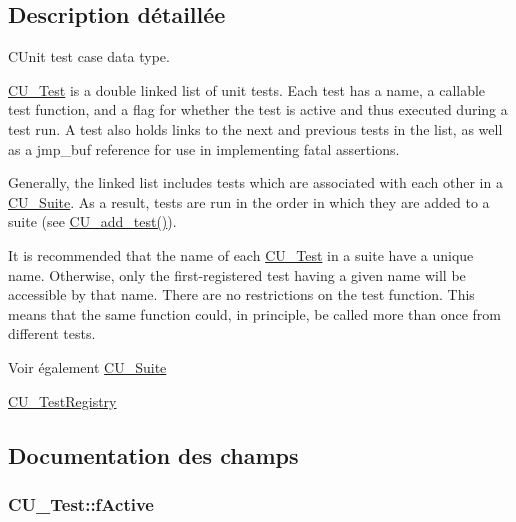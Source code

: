 \subsection{Description détaillée}
C\-Unit test case data type. 

\hyperlink{structCU__Test}{C\-U\-\_\-\-Test} is a double linked list of unit tests. Each test has a name, a callable test function, and a flag for whether the test is active and thus executed during a test run. A test also holds links to the next and previous tests in the list, as well as a jmp\-\_\-buf reference for use in implementing fatal assertions.\par
\par


Generally, the linked list includes tests which are associated with each other in a \hyperlink{structCU__Suite}{C\-U\-\_\-\-Suite}. As a result, tests are run in the order in which they are added to a suite (see \hyperlink{group__Framework_gad9f198a8a5fa8cc6870c3c8be873869f}{C\-U\-\_\-add\-\_\-test()}). \par
\par


It is recommended that the name of each \hyperlink{structCU__Test}{C\-U\-\_\-\-Test} in a suite have a unique name. Otherwise, only the first-\/registered test having a given name will be accessible by that name. There are no restrictions on the test function. This means that the same function could, in principle, be called more than once from different tests.

\begin{DoxySeeAlso}{Voir également}
\hyperlink{structCU__Suite}{C\-U\-\_\-\-Suite} 

\hyperlink{structCU__TestRegistry}{C\-U\-\_\-\-Test\-Registry} 
\end{DoxySeeAlso}


\subsection{Documentation des champs}
\hypertarget{structCU__Test_acd22f634d3a52462f0e2843d80383f08}{
\subsubsection[{f\-Active}]{ C\-U\-\_\-\-Test\-::f\-Active}}\label{structCU__Test_acd22f634d3a52462f0e2843d80383f08}


